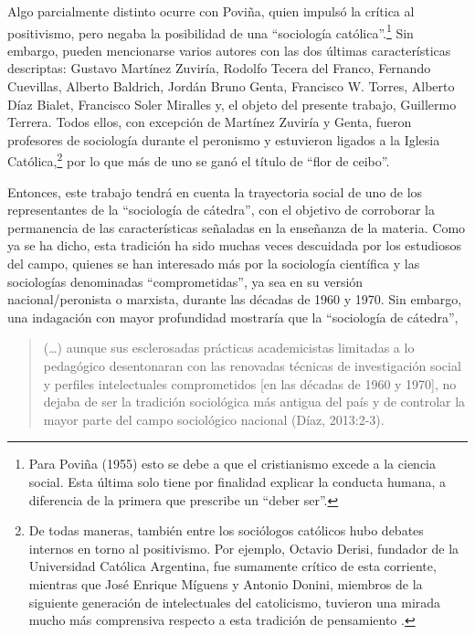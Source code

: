 Algo parcialmente distinto ocurre con Poviña, quien impulsó la crítica al positivismo, pero negaba la posibilidad de una ``sociología católica''.\footnote{Para Poviña (1955) esto se debe a que el cristianismo excede a la ciencia social. Esta última solo tiene por finalidad explicar la conducta humana, a diferencia de la primera que prescribe un ``deber ser''.} Sin embargo, pueden mencionarse varios autores con las dos últimas características descriptas: Gustavo Martínez Zuviría, Rodolfo Tecera del Franco, Fernando Cuevillas, Alberto Baldrich, Jordán Bruno Genta, Francisco W. Torres, Alberto Díaz Bialet, Francisco Soler Miralles y, el objeto del presente trabajo, Guillermo Terrera. Todos ellos, con excepción de Martínez Zuviría y Genta, fueron profesores de sociología durante el peronismo y estuvieron ligados a la Iglesia Católica,\footnote{De todas maneras, también entre los sociólogos católicos hubo debates internos en torno al positivismo. Por ejemplo, Octavio Derisi, fundador de la Universidad Católica Argentina, fue sumamente crítico de esta corriente, mientras que José Enrique Míguens y Antonio Donini, miembros de la siguiente generación de intelectuales del catolicismo, tuvieron una mirada mucho más comprensiva respecto a esta tradición de pensamiento \parencite{281-ZANCA2006}.} por lo que más de uno se ganó el título de ``flor de ceibo''.

Entonces, este trabajo tendrá en cuenta la trayectoria social de uno de los representantes de la ``sociología de cátedra'', con el objetivo de corroborar la permanencia de las características señaladas en la enseñanza de la materia. Como ya se ha dicho, esta tradición ha sido muchas veces descuidada por los estudiosos del campo, quienes se han interesado más por la sociología científica y las sociologías denominadas ``comprometidas'', ya sea en su versión nacional/peronista o marxista, durante las décadas de 1960 y 1970. Sin embargo, una indagación con mayor profundidad mostraría que la ``sociología de cátedra'',

\begin{quote}
(\dots) aunque sus esclerosadas prácticas academicistas limitadas a lo pedagógico desentonaran con las renovadas técnicas de investigación social y perfiles intelectuales comprometidos [en las décadas de 1960 y 1970], no dejaba de ser la tradición sociológica más antigua del país y de controlar la mayor parte del campo sociológico nacional (Díaz, 2013:2-3).
\end{quote}

